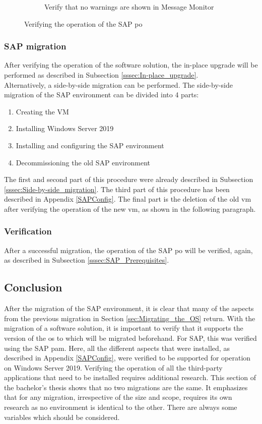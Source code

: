 \begin{figure}[h]
\begin{subfigure}{0.5\textwidth}
        \centering
        \caption{Verify that no warnings are shown in Message Monitor}
    \end{subfigure}
    \caption[Prerequisites of the in-place upgrade]{Verifying the operation of the SAP \acrshort{po}}
    \label{fig:SAPPreInPlace}	
\end{figure}

\subsubsection{SAP migration}
After verifying the operation of the software solution, the in-place upgrade will be performed as described in Subsection \ref{sssec:In-place_upgrade}.\\
Alternatively, a side-by-side migration can be performed. 
The side-by-side migration of the SAP environment can be divided into 4 parts:
\begin{enumerate}
    \item Creating the VM
    \item Installing Windows Server 2019
    \item Installing and configuring the SAP environment
    \item Decommissioning the old SAP environment
\end{enumerate}
The first and second part of this procedure were already described in Subsection \ref{sssec:Side-by-side_migration}.
The third part of this procedure has been described in Appendix \ref{SAPConfig}. 
The final part is the deletion of the old \acrshort{vm} after verifying the operation of the new \acrshort{vm}, as shown in the following paragraph.

\subsubsection{Verification}
After a successful migration, the operation of the SAP \acrshort{po} will be verified, again, as described in Subsection \ref{sssec:SAP_Prerequisites}.

\subsection{Conclusion}
After the migration of the SAP environment, it is clear that many of the aspects from the previous migration in Section \ref{sec:Migrating_the_OS} return. 
With the migration of a software solution, it is important to verify that it supports the version of the \acrshort{os} to which will be migrated beforehand. 
For SAP, this was verified using the SAP \acrshort{pam}.
Here, all the different aspects that were installed, as described in Appendix \ref{SAPConfig}, were verified to be supported for operation on Windows Server 2019. 
Verifying the operation of all the third-party applications that need to be installed requires additional research. 
This section of the bachelor's thesis shows that no two migrations are the same. 
It emphasizes that for any migration, irrespective of the size and scope, requires its own research as no environment is identical to the other. 
There are always some variables which should be considered.  
\clearpage

